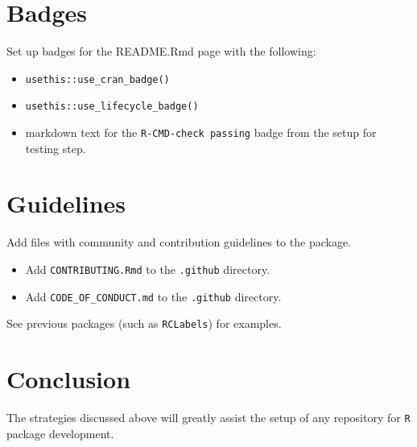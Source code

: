 \documentclass{article}
\begin{document}
\section{Badges}
\label{sec:badges}

Set up badges for the README.Rmd page with the following:

\begin{itemize}

  \item \verb|usethis::use_cran_badge()|

  \item \verb|usethis::use_lifecycle_badge()|

  \item markdown text for the \verb|R-CMD-check passing| badge from the setup for testing step.

\end{itemize}


\section{Guidelines}
\label{sec:guidelines}

Add files with community and contribution guidelines to the package.

\begin{itemize}

  \item Add \verb|CONTRIBUTING.Rmd| to the \verb|.github| directory.

  \item Add \verb|CODE_OF_CONDUCT.md| to the \verb|.github| directory.

\end{itemize}
%
See previous packages (such as \verb|RCLabels|) for examples.


\section{Conclusion}
\label{sec:conclusion}

The strategies discussed above will greatly assist the setup of any repository
for \texttt{R} package development.




% 
\end{document}
